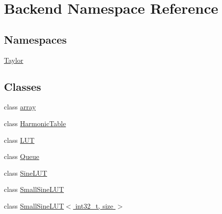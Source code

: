 \hypertarget{namespaceBackend}{\section{Backend Namespace Reference}
\label{namespaceBackend}
}
\subsection*{Namespaces}
\begin{DoxyCompactItemize}
\item 
 \hyperlink{namespaceBackend_1_1Taylor}{Taylor}
\end{DoxyCompactItemize}
\subsection*{Classes}
\begin{DoxyCompactItemize}
\item 
class \hyperlink{classBackend_1_1array}{array}
\item 
class \hyperlink{classBackend_1_1HarmonicTable}{Harmonic\+Table}
\item 
class \hyperlink{classBackend_1_1LUT}{L\+U\+T}
\item 
class \hyperlink{classBackend_1_1Queue}{Queue}
\item 
class \hyperlink{classBackend_1_1SineLUT}{Sine\+L\+U\+T}
\item 
class \hyperlink{classBackend_1_1SmallSineLUT}{Small\+Sine\+L\+U\+T}
\item 
class \hyperlink{classBackend_1_1SmallSineLUT_3_01int32__t_00_01size_01_4}{Small\+Sine\+L\+U\+T$<$ int32\+\_\+t, size $>$}
\end{DoxyCompactItemize}
